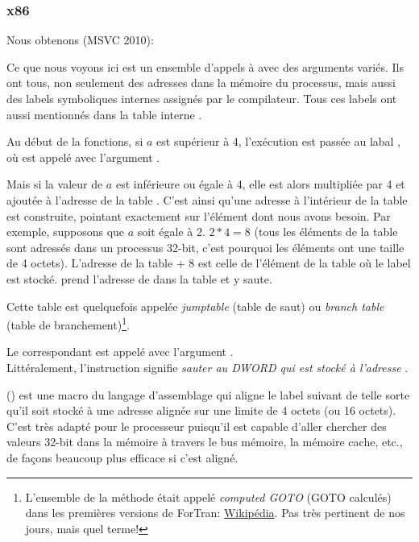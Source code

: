 \subsubsection{x86}


Nous obtenons (MSVC 2010):




Ce que nous voyons ici est un ensemble d'appels à \printf avec des arguments variés.
Ils ont tous, non seulement des adresses dans la mémoire du processus, mais aussi
des labels symboliques internes assignés par le compilateur.
Tous ces labels ont aussi mentionnés dans la table interne .

Au début de la fonctions, si $a$ est supérieur à 4, l'exécution est passée au
labal , où \printf est appelé avec l'argument .

Mais si la valeur de $a$ est inférieure ou égale à 4, elle est alors multipliée
par 4 et ajoutée à l'adresse de la table . C'est ainsi qu'une adresse
à l'intérieur de la table est construite, pointant exactement sur l'élément dont
nous avons besoin. Par exemple, supposons que $a$ soit égale à 2. $2*4 = 8$ (tous
les éléments de la table sont adressés dans un processus 32-bit, c'est pourquoi les
éléments ont une taille de 4 octets).
L'adresse de la table  + 8 est celle de l'élément de la table où
le label  est stocké.
\JMP prend l'adresse de  dans la table et y saute.

Cette table est quelquefois appelée \emph{jumptable} (table de saut) ou \emph{branch table}
(table de branchement)\footnote{L'ensemble de la méthode était appelé \emph{computed
GOTO} (GOTO calculés) dans les premières versions de ForTran:
\href{http://go.yurichev.com/17122}{Wikipédia}.
Pas très pertinent de nos jours, mais quel terme!}.

Le \printf correspondant est appelé avec l'argument .\\
Littéralement, l'instruction  signifie
\emph{sauter au DWORD qui est stocké à l'adresse} .

 () est une macro du langage d'assemblage qui aligne le
label suivant de telle sorte qu'il soit stocké à une adresse alignée sur une limite
de 4 octets (ou 16 octets).
C'est très adapté pour le processeur puisqu'il est capable d'aller chercher des
valeurs 32-bit dans la mémoire à travers le bus mémoire, la mémoire cache, etc.,
de façons beaucoup plus efficace si c'est aligné.

